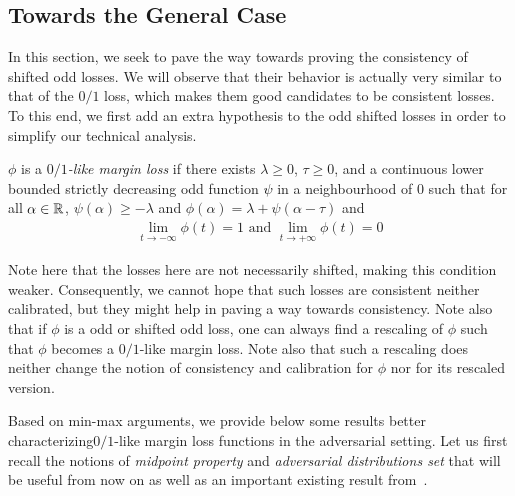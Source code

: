 \subsection{Towards the General Case}

In this section, we seek to pave the way towards proving the consistency of shifted odd losses. We will observe that their behavior is actually very similar to that of the $0/1$ loss, which makes them good candidates to be consistent losses. To this end, we first add an extra hypothesis to the odd shifted losses in order to simplify our technical analysis.


\begin{definition}
\label{def:limits}
$\phi$ is a \emph{$0/1$-like margin loss} if there exists $\lambda\geq0$, $\tau\geq0$, and a continuous lower bounded strictly decreasing odd function \textcolor{black}{$\psi$} in a neighbourhood of $0$ such that for all $\alpha\in\mathbb{R}$, $\psi(\alpha)\geq -\lambda$ and $\phi(\alpha) = \lambda+\psi(\alpha-\tau)$ and
\begin{align*}
\lim_{t\to-\infty}\phi(t)=1\text{ and }\lim_{t\to+\infty}\phi(t)=0
\end{align*}
\end{definition}

Note here that the losses here are not necessarily shifted, making this condition weaker. Consequently, we cannot hope that such losses are consistent neither calibrated, but they might help in paving a way towards consistency.  Note also that if $\phi$ is a odd or shifted odd loss, one can always find a rescaling of $\phi$ such that $\phi$ becomes a $0/1$-like margin loss. Note also that such a rescaling does neither change the notion of consistency and calibration for $\phi$ nor for its rescaled version.






Based on min-max arguments, we provide below some results better characterizing$0/1$-like margin loss functions in the adversarial setting. Let us first recall the notions of \emph{midpoint property} and \emph{adversarial distributions set} that will be useful from now on as well as an important existing result from~\citet{pydi2021many}. 

